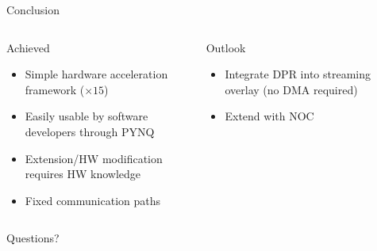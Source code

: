 \documentclass[aspectratio=169,t,xcolor={dvipsnames}]{beamer}
\begin{document}
\begin{frame}{Conclusion}
    \begin{columns}[T]
        \begin{column}{.45\textwidth}
            \begin{block}{Achieved}
                \begin{itemize}
                    \item Simple hardware acceleration framework ($\times 15$)
                    \item Easily usable by software developers through PYNQ
                    \item Extension/HW modification requires HW knowledge
                    \item Fixed communication paths
                \end{itemize}
            \end{block}
        \end{column}
        \begin{column}{.45\textwidth}
            \begin{block}{Outlook}
                \begin{itemize}
                    \item Integrate DPR into streaming overlay (no DMA required)
                    \item Extend with NOC
                \end{itemize}
            \end{block}
        \end{column}
    \end{columns}
\end{frame}


\begin{frame}{Questions?}
\end{frame}
\end{document}
